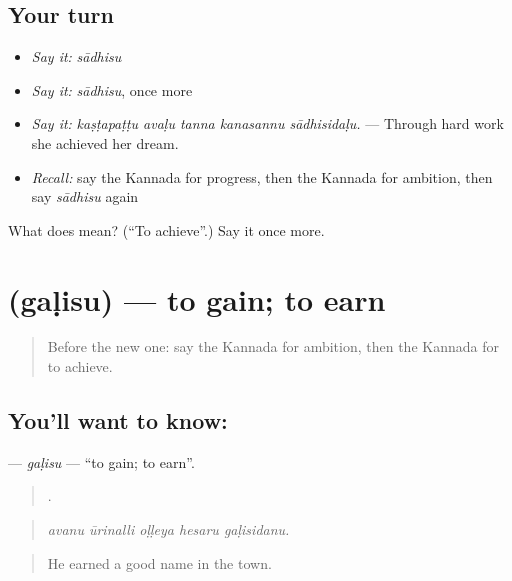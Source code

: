 \subsection*{Your turn}
\begin{itemize}
\raggedright
  \item \emph{Say it:} \emph{sādhisu}
  \item \emph{Say it:} \emph{sādhisu}, once more
  \item \emph{Say it:} \emph{kaṣṭapaṭṭu avaḷu tanna kanasannu sādhisidaḷu.} — Through hard work she achieved her dream.
  \item \emph{Recall:} say the Kannada for progress, then the Kannada for ambition, then say \emph{sādhisu} again
\end{itemize}

\begin{tcolorbox}[breakable,colback=teal!4,colframe=teal!35!black,title={Before you move on}]
What does  mean? (\textquotedblleft{}To achieve\textquotedblright{}.) Say it once more.
\end{tcolorbox}
\section[\texorpdfstring{\kn{ಗಳಿಸು} (gaḷisu)}{ಗಳಿಸು (gaḷisu)}]{ (gaḷisu) — to gain; to earn}

\label{lesson:KA-C517-galisu}



\begin{quote}
Before the new one: say the Kannada for ambition, then the Kannada for to achieve.
\end{quote}

\subsection*{You'll want to know: }
\textbf{} — \emph{gaḷisu} — \textquotedblleft{}to gain; to earn\textquotedblright{}.

\begin{quote}
    .
\end{quote}

\begin{quote}
\emph{avanu ūrinalli oḷḷeya hesaru gaḷisidanu.}
\end{quote}

\begin{quote}
He earned a good name in the town.
\end{quote}

